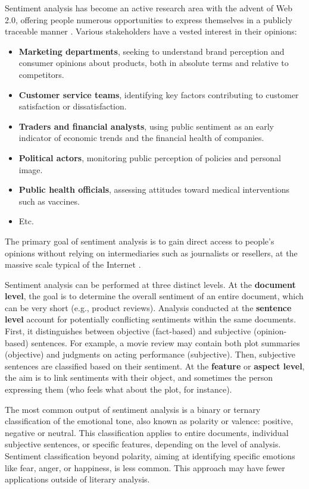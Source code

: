 \documentclass{article}
\begin{document}
Sentiment analysis has become an active research area with the advent of Web 2.0, offering people numerous opportunities to express themselves in a publicly traceable manner \citep{stine_sentiment_2019}. Various stakeholders have a vested interest in their opinions:
\begin{itemize}
    \item \textbf{Marketing departments}, seeking to understand brand perception and consumer opinions about products, both in absolute terms and relative to competitors.
    \item \textbf{Customer service teams}, identifying key factors contributing to customer satisfaction or dissatisfaction.
    \item \textbf{Traders and financial analysts}, using public sentiment as an early indicator of economic trends and the financial health of companies.
    \item \textbf{Political actors}, monitoring public perception of policies and personal image.
    \item \textbf{Public health officials}, assessing attitudes toward medical interventions such as vaccines.
    \item Etc.
\end{itemize}

The primary goal of sentiment analysis is to gain direct access to people's opinions without relying on intermediaries such as journalists or resellers, at the massive scale typical of the Internet \citep{ravi_survey_2015,hemmatian_survey_2019}.

Sentiment analysis can be performed at three distinct levels. At the \textbf{document level}, the goal is to determine the overall sentiment of an entire document, which can be very short (e.g., product reviews). Analysis conducted at the \textbf{sentence level} account for potentially conflicting sentiments within the same documents. First, it distinguishes between objective (fact-based) and subjective (opinion-based) sentences. For example, a movie review may contain both plot summaries (objective) and judgments on acting performance (subjective). Then, subjective sentences are classified based on their sentiment. At the \textbf{feature} or \textbf{aspect level}, the aim is to link sentiments with their object, and sometimes the person expressing them (who feels what about the plot, for instance).

The most common output of sentiment analysis is a binary or ternary classification of the emotional tone, also known as polarity or valence: positive, negative or neutral. This classification applies to entire documents, individual subjective sentences, or specific features, depending on the level of analysis. Sentiment classification beyond polarity, aiming at identifying specific emotions like fear, anger, or happiness, is less common. This approach may have fewer applications outside of literary analysis.
\end{document}
